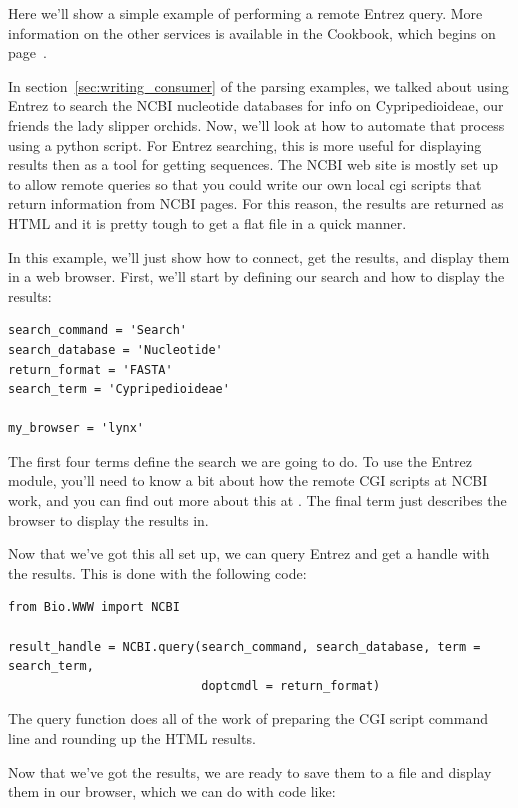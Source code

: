 \documentclass{report}
\begin{document}
Here we'll show a simple example of performing a remote Entrez query. More information on the other services is available in the Cookbook, which begins on page~\pageref{sec:cookbook}.


In section~\ref{sec:writing_consumer} of the parsing examples, we talked about using Entrez to search the NCBI nucleotide databases for info on Cypripedioideae, our friends the lady slipper orchids. Now, we'll look at how to automate that process using a python script. For Entrez searching, this is more useful for displaying results then as a tool for getting sequences. The NCBI web site is mostly set up to allow remote queries so that you could write our own local cgi scripts that return information from NCBI pages. For this reason, the results are returned as HTML and it is pretty tough to get a flat file in a quick manner.


In this example, we'll just show how to connect, get the results, and display them in a web browser. First, we'll start by defining our search and how to display the results:

\begin{verbatim}
search_command = 'Search'
search_database = 'Nucleotide'
return_format = 'FASTA'
search_term = 'Cypripedioideae'

my_browser = 'lynx'
\end{verbatim}

The first four terms define the search we are going to do. To use the Entrez module, you'll need to know a bit about how the remote CGI scripts at NCBI work, and you can find out more about this at . The final term just describes the browser to display the results in.


Now that we've got this all set up, we can query Entrez and get a handle with the results. This is done with the following code:

\begin{verbatim}
from Bio.WWW import NCBI

result_handle = NCBI.query(search_command, search_database, term = search_term,
                           doptcmdl = return_format)
\end{verbatim}

The query function does all of the work of preparing the CGI script command line and rounding up the HTML results.


Now that we've got the results, we are ready to save them to a file and display them in our browser, which we can do with code like:
\end{document}
